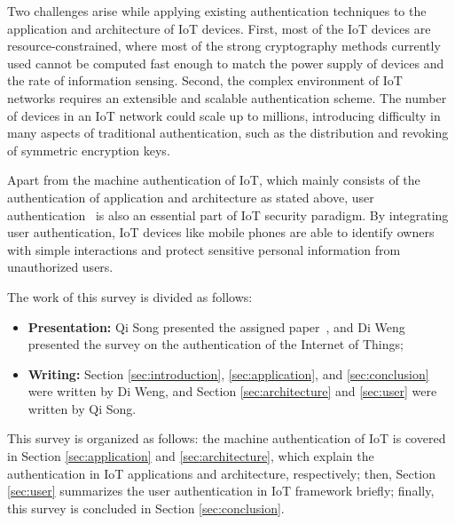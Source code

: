 Two challenges arise while applying existing authentication techniques to the application and architecture of IoT devices. First, most of the IoT devices are resource-constrained, where most of the strong cryptography methods currently used cannot be computed fast enough to match the power supply of devices and the rate of information sensing. Second, the complex environment of IoT networks requires an extensible and scalable authentication scheme. The number of devices in an IoT network could scale up to millions, introducing difficulty in many aspects of traditional authentication, such as the distribution and revoking of symmetric encryption keys.

Apart from the machine authentication of IoT, which mainly consists of the authentication of application and architecture as stated above, user authentication~\cite{o2003comparing} is also an essential part of IoT security paradigm. By integrating user authentication, IoT devices like mobile phones are able to identify owners with simple interactions and protect sensitive personal information from unauthorized users.


The work of this survey is divided as follows:

\begin{itemize}
	\item \textbf{Presentation:} Qi Song presented the assigned paper~\cite{DBLP:journals/tifs/FrankBMMS13}, and Di Weng presented the survey on the authentication of the Internet of Things;
	\item \textbf{Writing:} Section \ref{sec:introduction}, \ref{sec:application}, and \ref{sec:conclusion} were written by Di Weng, and Section \ref{sec:architecture} and \ref{sec:user} were written by Qi Song.
\end{itemize}

This survey is organized as follows: the machine authentication of IoT is covered in Section \ref{sec:application} and \ref{sec:architecture}, which explain the authentication in IoT applications and architecture, respectively; then, Section \ref{sec:user} summarizes the user authentication in IoT framework briefly; finally, this survey is concluded in Section \ref{sec:conclusion}.